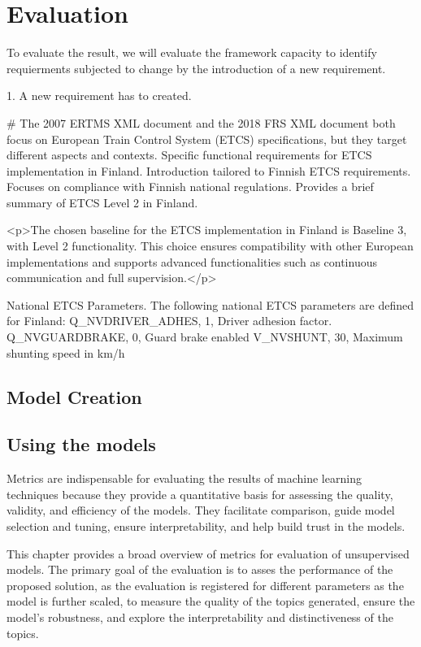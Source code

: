 \chapter{Evaluation} \label{chap:chap6}


To evaluate the result, we will evaluate the framework capacity to identify requierments subjected to change by the introduction of a new requirement.

1. 
A new requirement has to created.




#
The 2007 ERTMS XML document and the 2018 FRS XML document both focus on European Train Control System (ETCS) specifications, but they target different aspects and contexts. 
Specific functional requirements for ETCS implementation in Finland.
Introduction tailored to Finnish ETCS requirements.
Focuses on compliance with Finnish national regulations.
Provides a brief summary of ETCS Level 2 in Finland.

<p>The chosen baseline for the ETCS implementation in Finland is Baseline 3, with Level 2 functionality. This choice ensures compatibility with other European implementations and supports advanced functionalities such as continuous communication and full supervision.</p>


National ETCS Parameters. The following national ETCS parameters are defined for Finland:
Q_NVDRIVER_ADHES, 1, Driver adhesion factor.
Q_NVGUARDBRAKE, 0, Guard brake enabled
V_NVSHUNT, 30, Maximum shunting speed in km/h






\section{Model Creation}
\section{Using the models}



Metrics are indispensable for evaluating the results of machine learning techniques because they provide a quantitative basis for assessing the quality, validity, and efficiency of the models. They facilitate comparison, guide model selection and tuning, ensure interpretability, and help build trust in the models. 

This chapter provides a broad overview of metrics for evaluation of unsupervised models. The primary goal of the evaluation is to asses the performance of the proposed solution, as the evaluation is registered for different parameters as the model is further scaled, to measure the quality of the topics generated, ensure the model's robustness, and explore the interpretability and distinctiveness of the topics. 

